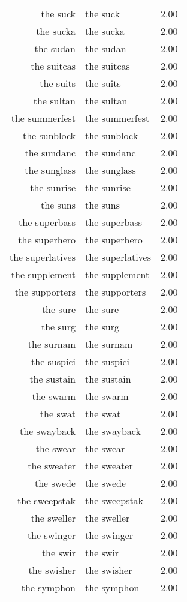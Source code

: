 \begin{table}[ht]
\begin{tabular}{rlr}
  the suck & the suck & 2.00 \\ 
  the sucka & the sucka & 2.00 \\ 
  the sudan & the sudan & 2.00 \\ 
  the suitcas & the suitcas & 2.00 \\ 
  the suits & the suits & 2.00 \\ 
  the sultan & the sultan & 2.00 \\ 
  the summerfest & the summerfest & 2.00 \\ 
  the sunblock & the sunblock & 2.00 \\ 
  the sundanc & the sundanc & 2.00 \\ 
  the sunglass & the sunglass & 2.00 \\ 
  the sunrise & the sunrise & 2.00 \\ 
  the suns & the suns & 2.00 \\ 
  the superbass & the superbass & 2.00 \\ 
  the superhero & the superhero & 2.00 \\ 
  the superlatives & the superlatives & 2.00 \\ 
  the supplement & the supplement & 2.00 \\ 
  the supporters & the supporters & 2.00 \\ 
  the sure & the sure & 2.00 \\ 
  the surg & the surg & 2.00 \\ 
  the surnam & the surnam & 2.00 \\ 
  the suspici & the suspici & 2.00 \\ 
  the sustain & the sustain & 2.00 \\ 
  the swarm & the swarm & 2.00 \\ 
  the swat & the swat & 2.00 \\ 
  the swayback & the swayback & 2.00 \\ 
  the swear & the swear & 2.00 \\ 
  the sweater & the sweater & 2.00 \\ 
  the swede & the swede & 2.00 \\ 
  the sweepstak & the sweepstak & 2.00 \\ 
  the sweller & the sweller & 2.00 \\ 
  the swinger & the swinger & 2.00 \\ 
  the swir & the swir & 2.00 \\ 
  the swisher & the swisher & 2.00 \\ 
  the symphon & the symphon & 2.00 \\ 

\end{tabular}
\end{table}
